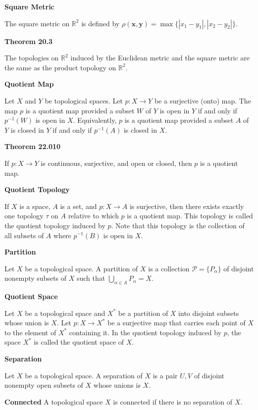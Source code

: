 \documentclass{article}
\newcommand{\inv}{^{-1}}
\newcommand{\R}{\mathbb R}
\begin{document}
\medskip\noindent\textbf{Square Metric}

	The square metric on $\R^2$ is defined by $\rho(\mathbf x,\mathbf y) = \max\{|x_1-y_1|, |x_2-y_2|\}$.

\medskip\noindent\textbf{Theorem 20.3}

	The topologies on $\R^2$ induced by the Euclidean metric and the square metric are the same as the product topology on $\R^2$.

\medskip\noindent\textbf{Quotient Map}

	Let $X$ and $Y$ be topological spaces.
	Let $p: X \to Y$ be a surjective (onto) map.
	The map $p$ is a quotient map provided a subset $W$ of $Y$ is open in $Y$ if and only if $p\inv(W)$ is open in $X$.
	Equivalently, $p$ is a quotient map provided a subset $A$ of $Y$ is closed in $Y$ if and only if $p\inv(A)$ is closed in $X$.

\medskip\noindent\textbf{Theorem 22.010}

	If $p: X \to Y$ is continuous, surjective, and open or closed, then $p$ is a quotient map.

\medskip\noindent\textbf{Quotient Topology}

	If $X$ is a space, $A$ is a set, and $p:X \to A$ is surjective, then there exists exactly one topology $\tau$ on $A$ relative to which $p$ is a quotient map. This topology is called the quotient topology induced by $p$. Note that this topology is the collection of all subsets of $A$ where $p\inv(B)$ is open in $X$.

\medskip\noindent\textbf{Partition}

	Let $X$ be a topological space.
	A partition of $X$ is a collection $\mathcal P=\{P_\alpha\}$ of disjoint nonempty subsets of $X$ such that $\bigcup\limits_{\alpha\in A}P_\alpha = X$.

\medskip\noindent\textbf{Quotient Space}

	Let $X$ be a topological space and $X^*$ be a partition of $X$ into disjoint subsets whose union is $X$. Let $p: X \to X^*$ be a surjective map that carries each point of $X$ to the element of $X^*$ containing it. In the quotient topology induced by $p$, the space $X^*$ is called the quotient space of $X$.

\medskip\noindent\textbf{Separation}

	Let $X$ be a topological space.
	A separation of $X$ is a pair $U,V$ of disjoint nonempty open subsets of $X$ whose unions is $X$.

\medskip\noindent\textbf{Connected}
	A topological space $X$ is connected if there is no separation of $X$.
\end{document}
